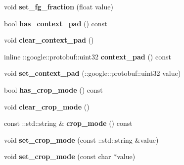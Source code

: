 \begin{DoxyCompactItemize}
void {\bfseries set\+\_\+fg\+\_\+fraction} (float value)
\item 
\mbox{\label{classcaffe_1_1_window_data_parameter_a4c6f5d6fe61b5d8a82f16e267687cc46}} 
bool {\bfseries has\+\_\+context\+\_\+pad} () const
\item 
\mbox{\label{classcaffe_1_1_window_data_parameter_abe632cf870180519c6d23d74de3f9ff0}} 
void {\bfseries clear\+\_\+context\+\_\+pad} ()
\item 
\mbox{\label{classcaffe_1_1_window_data_parameter_a1c805e62a509fa9bbb2a075e8f474e34}} 
inline \+::google\+::protobuf\+::uint32 {\bfseries context\+\_\+pad} () const
\item 
\mbox{\label{classcaffe_1_1_window_data_parameter_a41dccc8003d50d29d81505b1ba77802c}} 
void {\bfseries set\+\_\+context\+\_\+pad} (\+::google\+::protobuf\+::uint32 value)
\item 
\mbox{\label{classcaffe_1_1_window_data_parameter_a83ee0335a01ee6ec0e55f457c2a6bb9a}} 
bool {\bfseries has\+\_\+crop\+\_\+mode} () const
\item 
\mbox{\label{classcaffe_1_1_window_data_parameter_ae700b81ca3585f5b057c1fe5cd8ca959}} 
void {\bfseries clear\+\_\+crop\+\_\+mode} ()
\item 
\mbox{\label{classcaffe_1_1_window_data_parameter_a96fd2e5fa04963facbb9997e0142a2f1}} 
const \+::std\+::string \& {\bfseries crop\+\_\+mode} () const
\item 
\mbox{\label{classcaffe_1_1_window_data_parameter_a188e18eb4664231a81982e97a91171a7}} 
void {\bfseries set\+\_\+crop\+\_\+mode} (const \+::std\+::string \&value)
\item 
\mbox{\label{classcaffe_1_1_window_data_parameter_aa566ad7261dd5a502b81c94430ef5364}} 
void {\bfseries set\+\_\+crop\+\_\+mode} (const char $\ast$value)
\item 

\end{DoxyCompactItemize}
